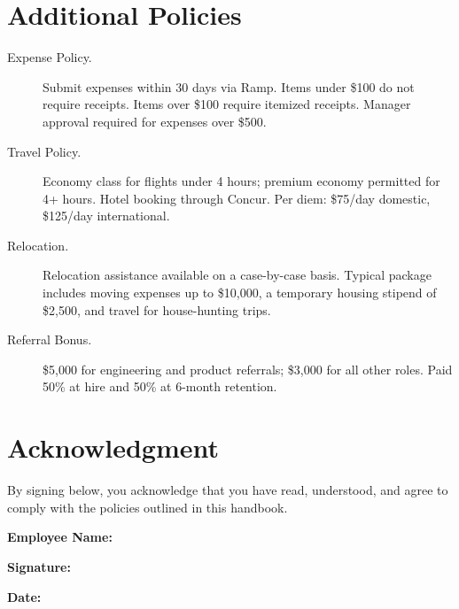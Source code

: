 \documentclass[
    language=english,
    doctype=employee-handbook,
    institution=none,
]{../../omnilatex}
\begin{document}
\section{Additional Policies}

\begin{description}
    \item[Expense Policy.] Submit expenses within 30 days via Ramp. Items
        under \$100 do not require receipts. Items over \$100 require
        itemized receipts. Manager approval required for expenses over
        \$500.
    \item[Travel Policy.] Economy class for flights under 4 hours; premium
        economy permitted for 4+ hours. Hotel booking through Concur.
        Per diem: \$75/day domestic, \$125/day international.
    \item[Relocation.] Relocation assistance available on a case-by-case
        basis. Typical package includes moving expenses up to \$10,000,
        a temporary housing stipend of \$2,500, and travel for house-hunting
        trips.
    \item[Referral Bonus.] \$5,000 for engineering and product referrals;
        \$3,000 for all other roles. Paid 50\% at hire and 50\% at
        6-month retention.
\end{description}

\section{Acknowledgment}

By signing below, you acknowledge that you have read, understood, and agree
to comply with the policies outlined in this handbook.

\vspace{2em}
\noindent\textbf{Employee Name:} \underline{\hspace{8cm}}

\vspace{1em}
\noindent\textbf{Signature:} \underline{\hspace{8cm}}

\vspace{1em}
\noindent\textbf{Date:} \underline{\hspace{8cm}}

\printbibliography[heading=none]
\end{document}

